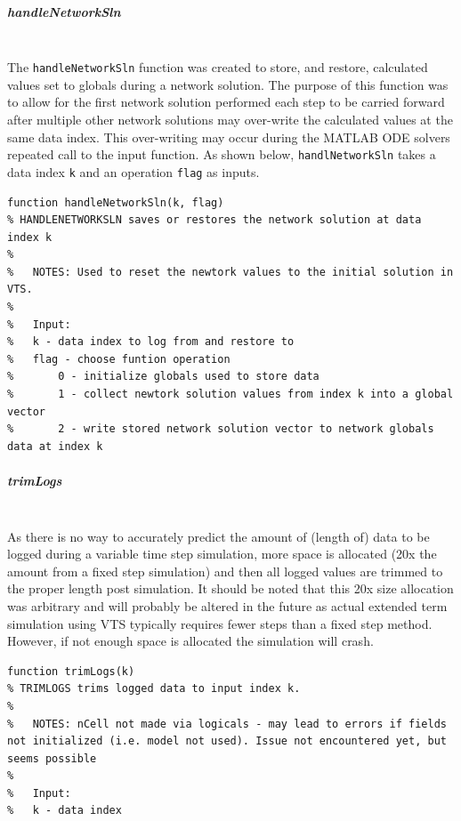\documentclass[12pt]{article}
\begin{document}
\pagebreak
\subparagraph{handleNetworkSln} \ \\
The \verb|handleNetworkSln| function was created to store, and restore, calculated values set to globals during a network solution.
The purpose of this function was to allow for the first network solution performed each step to be carried forward after multiple other network solutions may over-write the calculated values at the same data index.
This over-writing may occur during the MATLAB ODE solvers repeated call to the input function.
As shown below, \verb|handlNetworkSln| takes a data index \verb|k| and an operation \verb|flag| as inputs.
\begin{verbatim}
function handleNetworkSln(k, flag)
% HANDLENETWORKSLN saves or restores the network solution at data index k
%
%   NOTES: Used to reset the newtork values to the initial solution in VTS.
%
%   Input:
%   k - data index to log from and restore to
%   flag - choose funtion operation
%       0 - initialize globals used to store data
%       1 - collect newtork solution values from index k into a global vector
%       2 - write stored network solution vector to network globals data at index k
\end{verbatim}

\subparagraph{trimLogs} \ \\
As there is no way to accurately predict the amount of (length of) data to be logged during a variable time step simulation, more space is allocated (20x the amount from a fixed step simulation) and then all logged values are trimmed to the proper length post simulation.
It should be noted that this 20x size allocation was arbitrary and will probably be altered in the future as actual extended term simulation using VTS typically requires fewer steps than a fixed step method.
However, if not enough space is allocated the simulation will crash.

\begin{verbatim}
function trimLogs(k)
% TRIMLOGS trims logged data to input index k.
%
%   NOTES: nCell not made via logicals - may lead to errors if fields not initialized (i.e. model not used). Issue not encountered yet, but seems possible
%
%   Input:
%   k - data index
\end{verbatim} 
\end{document}
